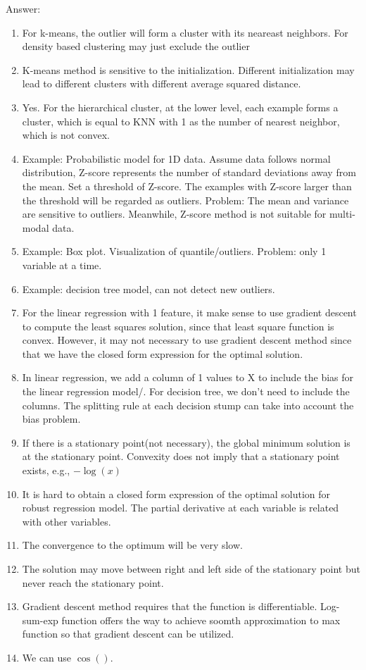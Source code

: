 \documentclass{article}
\def\gre#1{{\color{gre}#1}}
\begin{document}
\gre{Answer:
\begin{enumerate}
    \item For k-means, the outlier will form a cluster with its neareast neighbors. For density based clustering may just exclude the outlier
    \item K-means method is sensitive to the initialization. Different initialization may lead to different clusters with different average squared distance.
    \item Yes. For the hierarchical cluster, at the lower level, each example forms a cluster, which is equal to KNN with 1 as the number of nearest neighbor, which is not convex.
    \item  Example: Probabilistic model for 1D data. Assume data follows normal distribution, Z-score represents the number of standard deviations away from the mean. Set a threshold of Z-score. The examples with Z-score larger than the threshold will be regarded as outliers.
    Problem: The mean and variance are sensitive to outliers. Meanwhile, Z-score method is not suitable for multi-modal data.
    \item Example: Box plot. Visualization of quantile/outliers.
    Problem: only 1 variable at a time.
    \item Example: decision tree model, can not detect new outliers.
    \item For the linear regression with 1 feature, it make sense to use gradient descent to compute the least squares solution, since that least square function is convex. However, it may not necessary to use gradient descent method since that we have the closed form expression for the optimal solution.
    \item In linear regression, we add a column of 1 values to X to include the bias for the linear regression model/.
    For decision tree, we don't need to include the columns. The splitting rule at each decision stump can take into account the bias problem.
    \item If there is a stationary point(not necessary), the global minimum solution is at the stationary point. Convexity does not imply that a stationary point exists, e.g., $-\log(x)$
    \item It is hard to obtain a closed form expression of the optimal solution for robust regression model. The partial derivative at  each variable is related with other variables.
    \item The convergence to the optimum will be very slow.
    \item The solution may move between right and left side of the stationary point  but never reach the stationary point.
    \item Gradient descent method requires that the function is differentiable. Log-sum-exp function offers the way to achieve soomth approximation to max function so that gradient descent can be utilized.
    \item We can use $\cos()$.
\end{enumerate}
}
\end{document}
